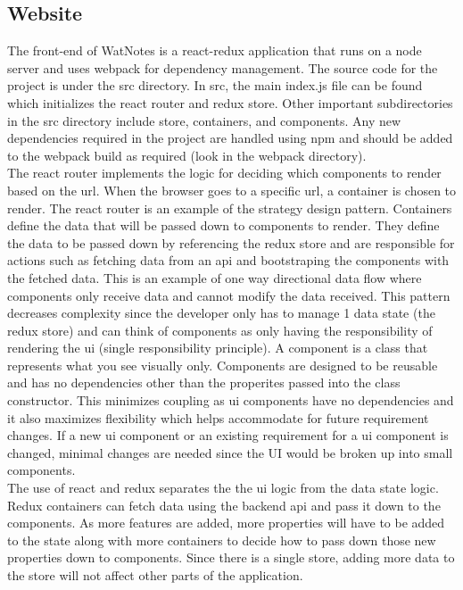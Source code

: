\documentclass[12pt]{article}
\begin{document}
  \subsection{Website}
  The front-end of WatNotes is a react-redux application that runs on a node server and uses webpack for dependency management. The source code for the project is under the src directory. In src, the main index.js file can be found which initializes the react router and redux store. Other important subdirectories in the src directory include store, containers, and components. Any new dependencies required in the project are handled using npm and should be added to the webpack build as required (look in the webpack directory).\\

  The react router implements the logic for deciding which components to render based on the url. When the browser goes to a specific url, a container is chosen to render. The react router is an example of the strategy design pattern. Containers define the data that will be passed down to components to render. They define the data to be passed down by referencing the redux store and are responsible for actions such as fetching data from an api and bootstraping the components with the fetched data. This is an example of one way directional data flow where components only receive data and cannot modify the data received. This pattern decreases complexity since the developer only has to manage 1 data state (the redux store) and can think of components as only having the responsibility of rendering the ui (single responsibility principle). A component is a class that represents what you see visually only. Components are designed to be reusable and has no dependencies other than the properites passed into the class constructor. This minimizes coupling as ui components have no dependencies and it also maximizes flexibility which helps accommodate for future requirement changes. If a new ui component or an existing requirement for a ui component is changed, minimal changes are needed since the UI would be broken up into small components.\\

  The use of react and redux separates the the ui logic from the data state logic. Redux containers can fetch data using the backend api and pass it down to the components. As more features are added, more properties will have to be added to the state along with more containers to decide how to pass down those new properties down to components. Since there is a single store, adding more data to the store will not affect other parts of the application.
\end{document}
